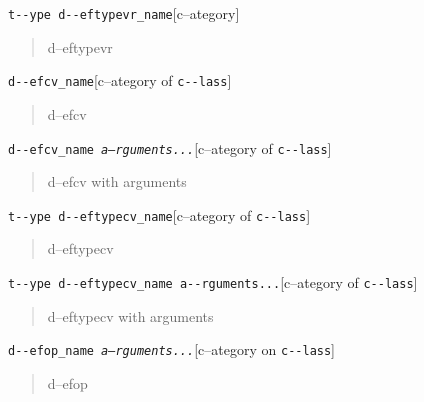 \documentclass{book}
\begin{document}
\begin{titlepage}
\noindent\texttt{t{-}{-}ype d{-}{-}eftypevr\_name}\hfill[c--ategory]



%
\begin{quote}
\unskip{\parskip=0pt\noindent}%
d--eftypevr
\end{quote}

\noindent\texttt{d{-}{-}efcv\_name}\hfill[c--ategory of \texttt{c{-}{-}lass}]



%
\begin{quote}
\unskip{\parskip=0pt\noindent}%
d--efcv
\end{quote}

\noindent\texttt{d{-}{-}efcv\_name \EmbracOn{}\textnormal{\textsl{a--rguments...}}\EmbracOff{}}\hfill[c--ategory of \texttt{c{-}{-}lass}]



%
\begin{quote}
\unskip{\parskip=0pt\noindent}%
d--efcv with arguments
\end{quote}

\noindent\texttt{t{-}{-}ype d{-}{-}eftypecv\_name}\hfill[c--ategory of \texttt{c{-}{-}lass}]



%
\begin{quote}
\unskip{\parskip=0pt\noindent}%
d--eftypecv
\end{quote}

\noindent\texttt{t{-}{-}ype d{-}{-}eftypecv\_name a{-}{-}rguments...}\hfill[c--ategory of \texttt{c{-}{-}lass}]



%
\begin{quote}
\unskip{\parskip=0pt\noindent}%
d--eftypecv with arguments
\end{quote}

\noindent\texttt{d{-}{-}efop\_name \EmbracOn{}\textnormal{\textsl{a--rguments...}}\EmbracOff{}}\hfill[c--ategory on \texttt{c{-}{-}lass}]



%
\begin{quote}
\unskip{\parskip=0pt\noindent}%
d--efop
\end{quote}


\end{titlepage}
\end{document}
